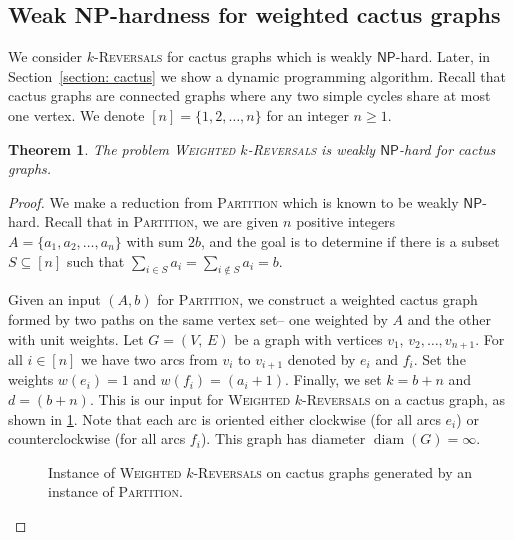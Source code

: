 \documentclass[11pt, twoside]{article}
\numberwithin{equation}{section}
\numberwithin{table}{section}
\numberwithin{figure}{section}
\newtheorem{theorem}{Theorem}[section]
\theoremstyle{definition}
\theoremstyle{definition}
\theoremstyle{definition}
\def\NP{\mathsf{NP}}
\begin{document}
    
    
\subsection{Weak NP-hardness for weighted cactus graphs}
We consider \textsc{$k$-Reversals} for cactus graphs which is weakly $\NP$-hard. Later, in Section~\ref{section: cactus} we show a dynamic programming algorithm.  Recall that cactus graphs are connected graphs where any two simple cycles share at most one vertex. We denote $[n]=\{1, 2, \dots, n \}$ for an integer $n\geq 1$.
\begin{theorem} \label{thm:weaklyNP_wcactus}
The problem \textsc{Weighted $k$-Reversals} is weakly $\NP$-hard for cactus graphs.
\end{theorem}
\begin{proof}
    We make a reduction from \textsc{Partition} which is known to be weakly $\NP$-hard. Recall that in \textsc{Partition}, we are given
        {$n$ positive integers $A = \{a_1, a_2, \dots,a_n\}$ with sum $2b$}, and the goal is to
        {determine if there is a subset $S \subseteq [n]$ such that
    $\sum_{i \in S} a_i= \sum_{i \not\in S} a_i=b$.}

    Given an input $(A, b)$ for \textsc{Partition}, we construct a weighted cactus graph formed by two paths on the same vertex set-- one weighted by $A$ and the other with unit weights.
    Let $G=(V, \, E)$ be a graph with vertices $v_1, \, v_2,\ldots, v_{n+1}$. For all $i\in [n]$ we have two arcs from $v_i$ to $v_{i+1}$ denoted by $e_i$ and $f_i$.  
    Set the weights $w(e_i)=1$ and $w(f_i)=(a_i+1)$.
    Finally, we set $k = b+n$ and $d = (b+n)$.
    This is our input for \textsc{Weighted $k$-Reversals} on a  cactus graph, as shown in \cref{fig:weighted_cactus}.
    Note that each arc is oriented either clockwise (for all arcs $e_i$) or counterclockwise (for all arcs $f_i$). This graph has diameter $\operatorname{diam}(G) = \infty$.

    \begin{figure}[t]
        \centering
        \caption{Instance of  \textsc{Weighted $k$-Reversals} on cactus graphs generated by an instance of \textsc{Partition}.}
        \label{fig:weighted_cactus}
    \end{figure}
    

\end{proof}
\end{document}
